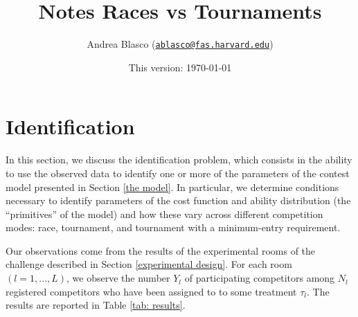 \documentclass[]{article}
\title{Notes Races vs Tournaments}
\author{Andrea Blasco
(\href{mailto:ablasco@fas.harvard.edu}{\nolinkurl{ablasco@fas.harvard.edu}})}
\date{This version: \today}
\theoremstyle{plain} %
\begin{document}
\maketitle


\clearpage
\tableofcontents
\setcounter{tocdepth}{2}
\clearpage

\section{Identification}\label{identification}

In this section, we discuss the identification problem, which consists
in the ability to use the observed data to identify one or more of the
parameters of the contest model presented in Section \ref{the model}. In
particular, we determine conditions necessary to identify parameters of
the cost function and ability distribution (the ``primitives'' of the
model) and how these vary across different competition modes: race,
tournament, and tournament with a minimum-entry requirement.

Our observations come from the results of the experimental rooms of the
challenge described in Section \ref{experimental design}. For each room
\((l=1, ..., L)\), we observe the number \(Y_l\) of participating
competitors among \(N_l\) registered competitors who have been assigned
to to some treatment \(\tau_l\). The results are reported in Table
\ref{tab: results}.
\end{document}
